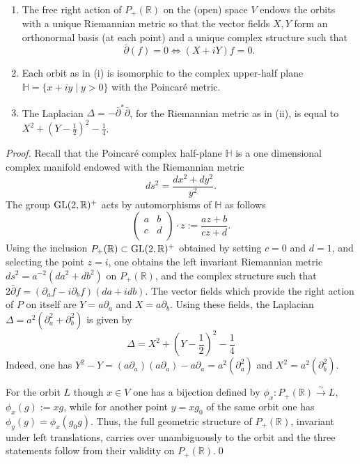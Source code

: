 \documentclass[graybox, envcountsect%
]{svmult}
\def\GL{{\rm GL}}
\def\R{{\mathbb R}}
\def\H{{\mathbb H}}
\def\no{\noindent}
\begin{document}
 \begin{proposition}\label{ax+bact}\
 \begin{enumerate}
 \item[(i)] The  free right action of  $P_+(\R)$ on the (open) space $V$ endows the orbits with a unique Riemannian metric so that the vector fields $X,Y$ form an orthonormal basis (at each point) and a unique complex structure such that  $$\bar \partial(f)=0\iff (X+iY)f=0.$$
\item[(ii)] Each orbit as in (i) is isomorphic to the complex upper-half  plane $\H=\{x+iy\mid y>0\}$ with the Poincar\'e metric.
\item[(iii)] The Laplacian $\Delta=-\bar\partial^*\bar \partial$, for the  Riemannian metric as in (ii), is equal to $X^2+(Y-\frac 12)^2-\frac 14$.
\end{enumerate}	
\end{proposition}
\begin{proof} Recall that the Poincar\'e complex half-plane $\H$ is a one dimensional complex manifold endowed with the Riemannian metric 
$$
ds^2=\frac{dx^2+dy^2}{y^2}.
$$
The group $\GL(2,\R)^+$ acts by automorphisms of $\H$ as follows
$$
\left(
\begin{array}{cc}
 a & b \\
 c & d \\
\end{array}
\right)\cdot z:=\frac{az+b}{cz+d}.
$$
Using the inclusion $P_+(\R)\subset \GL(2,\R)^+$ obtained by setting $c=0$ and $d=1$, and selecting the point $z=i$, one obtains the left invariant Riemannian metric $ds^2=a^{-2}(da^2+db^2)$ on $P_+(\R)$, and the complex structure such that $2\bar \partial f= (\partial_a f-i \partial_b f)(da+i db)$. The vector fields which provide the right action of $P$ on itself are $Y=a\partial_a$ and $X=a\partial_b$. Using these fields, the Laplacian $\Delta=a^2(\partial_a^2+\partial_b^2)$ is given by 
\begin{equation}\label{lapxy}
	\Delta=X^2+(Y-\frac 12)^2-\frac 14
\end{equation}
Indeed, one has $Y^2-Y=(a\partial_a)(a\partial_a)-a\partial_a=a^2(\partial_a^2)$ and $X^2=a^2(\partial_b^2)$. 

\no For the orbit $L$ though $x\in V$ one has a bijection defined by $\phi_x:P_+(\R)\stackrel{\sim}{\to} L$, $\phi_x(g):=xg$, while for another point $y=xg_0$ of the same orbit one has
$
\phi_y(g)=\phi_x(g_0g).
$
Thus, the full geometric structure of $P_+(\R)$, invariant under left translations, carries over unambiguously to the orbit and the three statements follow from their validity on $P_+(\R)$.\qed\end{proof} 
\end{document}

